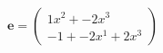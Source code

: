 \documentclass[preview]{standalone}
\begin{document}
\begin{align*}
\mathbf{e} = \begin{pmatrix}1x^{2} + -2x^{3} \\ -1 + -2x^{1} + 2x^{3}\end{pmatrix}
\end{align*}
\end{document}
